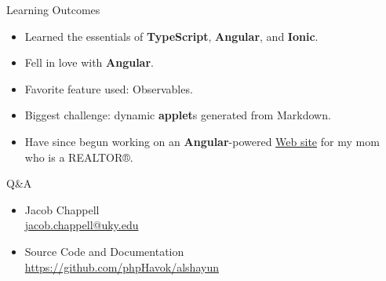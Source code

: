 \documentclass{beamer}
\begin{document}
\begin{frame}{Learning Outcomes}
    \begin{itemize}
        \item Learned the essentials of \textbf{TypeScript}, \textbf{Angular},
            and \textbf{Ionic}.
        \item Fell in love with \textbf{Angular}.
        \item Favorite feature used: Observables.
        \item Biggest challenge: dynamic \textbf{applet}s generated from
            Markdown.
        \item Have since begun working on an \textbf{Angular}-powered
            \href{https://kristinickells.com}{Web site} for my mom who is a
            REALTOR®.
    \end{itemize}
\end{frame}

\begin{frame}{Q\&A}
    \begin{itemize}
        \item \begin{center}
                Jacob Chappell \\
                \href{mailto:jacob.chappell@uky.edu}{jacob.chappell@uky.edu}
                \vfill
        \end{center}
        \item \begin{center}
                Source Code and Documentation \\ \url{https://github.com/phpHavok/alshayun}
        \end{center}
    \end{itemize}
\end{frame}
\end{document}
